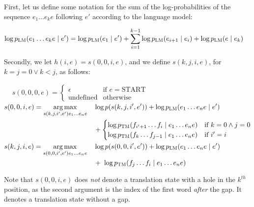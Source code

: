 \documentclass[answers]{exam}
\newcommand{\ptm}[1]{p_{\textsc{TM}}(#1)}
\newcommand{\plm}[1]{p_{\textsc{LM}}(#1)}
\DeclareMathOperator*{\argmax}{arg\,max}
\begin{document}
\begin{questions}
\begin{framed}
  \begingroup\raggedright
  First, let us define some notation for the sum of the log-probabilities of the
  sequence $e_{1}\dots e_{k}e$ following $e'$ according to the language model: 
  \par\endgroup
  \(\!
  \begin{aligned}
    \log{\plm{e_{1}\dots e_{k}e \mid e'}}
    = \log{\plm{e_{1} \mid e'}}
    + \sum_{i=1}^{k-1}{\log{\plm{e_{i+1} \mid e_{i}}}}
    + \log{\plm{e \mid e_{k}}}
  \end{aligned}
  \)
  \\
  \begingroup\raggedright
  Secondly, we let $h(i,e) = s(0,0,i,e)$, and we define $s(k,j,i,e)$, for $k =
  j = 0 \lor k < j$, as follows:
  \par\endgroup
  \(\!
  \begin{aligned}
    &s(0,0,0,e) =
    \begin{cases}
      \epsilon         &\text{if }e = \text{START}\\
      \text{undefined} &\text{otherwise}
    \end{cases}
  \end{aligned}
  \)
  \(\!
  \begin{aligned}
    &s(0,0,i,e) = \argmax_{s(k,j,i',e')e_{1}\dots e_{n}e}
    &&\log{p(s(k,j,i',e'))} + \log{\plm{e_{1}\dots e_{n}e \mid e'}}
    \\& &&+
    \begin{cases}
      \log{\ptm{f_{i'+1}\dots f_{i} \mid e_{1}\dots e_{n}e}}
      &\text{if }k = 0 \land j = 0
      \\
      \log{\ptm{f_{k}\dots f_{j-1} \mid e_{1}\dots e_{n}e}}
      &\text{if }i' = i
    \end{cases}
    \\
    &s(k,j,i,e) =
    \argmax_{s(0,0,i',e')e_{1}\dots e_{n}e}
    &&\log{p(s(0,0,i',e'))} + \log{\plm{e_{1}\dots e_{n}e \mid e'}} 
    \\& &&+\;\log{\ptm{f_{j}\dots f_{i} \mid e_{1}\dots e_{n}e}}
  \end{aligned}
  \)
  \\
  \begingroup\raggedright
  Note that $s(0,0,i,e)$ does \emph{not} denote a translation state with a hole
  in the $k^{th}$ position, as the second argument is the index of the first
  word \emph{after} the gap. It denotes a translation state without a gap.
  \par\endgroup
\end{framed}



\end{questions}
\end{document}
